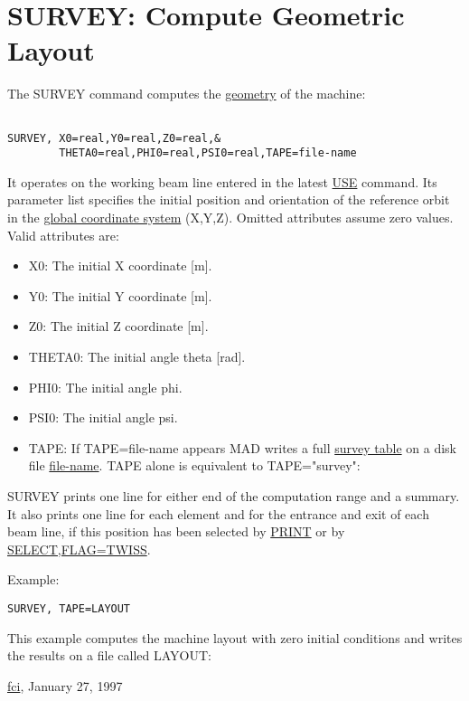 




\section{SURVEY: Compute Geometric Layout}  The SURVEY command computes the \href{global.html}{geometry} of the machine: 
\begin{verbatim}

SURVEY, X0=real,Y0=real,Z0=real,&
        THETA0=real,PHI0=real,PSI0=real,TAPE=file-name
\end{verbatim} It operates on the working beam line entered in the latest \href{use.html}{USE} command. Its parameter list specifies the initial position and orientation of the reference orbit in the \href{global.html}{global coordinate system} (X,Y,Z). Omitted attributes assume zero values. Valid attributes are: 
\begin{itemize}
	\item X0: The initial X coordinate [m]. 
	\item Y0: The initial Y coordinate [m]. 
	\item Z0: The initial Z coordinate [m]. 
	\item THETA0: The initial angle theta [rad]. 
	\item PHI0: The initial angle phi. 
	\item PSI0: The initial angle psi. 
	\item TAPE: If TAPE=file-name appears MAD writes a full \href{tape3.html#survey}{survey table} on a disk file \href{files.html}{file-name}. TAPE alone is equivalent to TAPE="survey": 
\end{itemize} SURVEY prints one line for either end of the computation range and a summary. It also prints one line for each element and for the entrance and exit of each beam line, if this position has been selected by \href{print.html}{PRINT} or by \href{print.html}{SELECT,FLAG=TWISS}. 

  Example: 
\begin{verbatim}
SURVEY, TAPE=LAYOUT
\end{verbatim} This example computes the machine layout with zero initial conditions and writes the results on a file called LAYOUT:

  \href{http://wwwslap.cern.ch/fci/fci_sign.html}{fci}, January 27, 1997 

